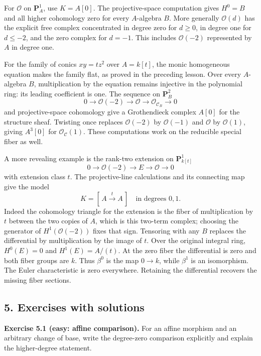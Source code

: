 \documentclass[11pt]{article}
\begin{document}
For \(\mathcal O\) on \(\mathbf P^1_A\), use \(K=A[0]\). The
projective-space computation gives \(H^0=B\) and all higher cohomology
zero for every \(A\)-algebra \(B\). More generally \(\mathcal O(d)\) has
the explicit free complex concentrated in degree zero for \(d\geq0\), in
degree one for \(d\leq-2\), and the zero complex for \(d=-1\). This
includes \(\mathcal O(-2)\) represented by \(A\) in degree one.

For the family of conics \(xy=tz^2\) over \(A=k[t]\), the monic
homogeneous equation makes the family flat, as proved in the preceding
lesson. Over every \(A\)-algebra \(B\), multiplication by the equation
remains injective in the polynomial ring: its leading coefficient is
one. The sequence on \(\mathbf P^2_B\) \[
0\to\mathcal O(-2)\to\mathcal O\to\mathcal O_{\mathcal C_B}\to0
\] and projective-space cohomology give a Grothendieck complex \(A[0]\)
for the structure sheaf. Twisting once replaces \(\mathcal O(-2)\) by
\(\mathcal O(-1)\) and \(\mathcal O\) by \(\mathcal O(1)\), giving
\(A^3[0]\) for \(\mathcal O_{\mathcal C}(1)\). These computations work
on the reducible special fiber as well.

A more revealing example is the rank-two extension on
\(\mathbf P^1_{k[t]}\) \[
0\to\mathcal O(-2)\to E\to\mathcal O\to0
\] with extension class \(t\). The projective-line calculations and its
connecting map give the model \[
K=[\,A\xrightarrow{t}A\,]\quad\text{in degrees }0,1.
\] Indeed the cohomology triangle for the extension is the fiber of
multiplication by \(t\) between the two copies of \(A\), which is this
two-term complex; choosing the generator of \(H^1(\mathcal O(-2))\)
fixes that sign. Tensoring with any \(B\) replaces the differential by
multiplication by the image of \(t\). Over the original integral ring,
\(H^0(E)=0\) and \(H^1(E)=A/(t)\). At the zero fiber the differential is
zero and both fiber groups are \(k\). Thus \(\beta^0\) is the map
\(0\to k\), while \(\beta^1\) is an isomorphism. The Euler
characteristic is zero everywhere. Retaining the differential recovers
the missing fiber sections.

\subsection{5. Exercises with
solutions}\label{exercises-with-solutions-7}

\textbf{Exercise 5.1 (easy: affine comparison).} For an affine morphism
and an arbitrary change of base, write the degree-zero comparison
explicitly and explain the higher-degree statement.
\end{document}
